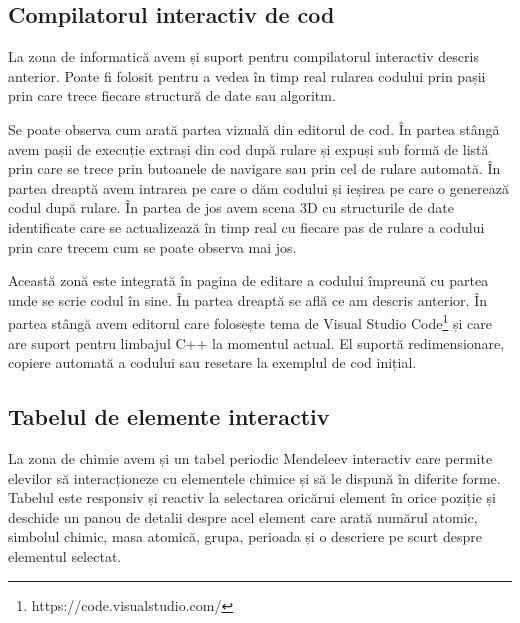 \subsection{Compilatorul interactiv de cod}
\label{subsec:compilator-interactiv}

La zona de informatică avem și suport pentru compilatorul interactiv descris anterior. Poate fi
folosit pentru a vedea în timp real rularea codului prin pașii prin care trece fiecare structură de
date sau algoritm.

Se poate observa cum arată partea vizuală din editorul de cod. În partea stângă avem pașii de 
execuție extrași din cod după rulare și expuși sub formă de listă prin care se trece prin butoanele
de navigare sau prin cel de rulare automată. În partea dreaptă avem intrarea pe care o dăm codului
și ieșirea pe care o generează codul după rulare. În partea de jos avem scena 3D cu structurile de 
date identificate care se actualizează în timp real cu fiecare pas de rulare a codului prin care
trecem cum se poate observa mai jos.


Această zonă este integrată în pagina de editare a codului împreună cu partea unde se scrie codul
în sine. În partea dreaptă se află ce am descris anterior. În partea stângă avem editorul care folosește 
tema de Visual Studio Code\footnote{https://code.visualstudio.com/} și care are suport pentru 
limbajul C++ la momentul actual. El suportă redimensionare, copiere automată a codului sau 
resetare la exemplul de cod inițial.

\subsection{Tabelul de elemente interactiv}
\label{subsec:tablou-elemente-interactiv}

La zona de chimie avem și un tabel periodic Mendeleev interactiv care permite elevilor să interacționeze
cu elementele chimice și să le dispună în diferite forme. Tabelul este responsiv și reactiv
la selectarea oricărui element în orice poziție și deschide un panou de detalii despre acel element
care arată numărul atomic, simbolul chimic, masa atomică, grupa, perioada și o descriere pe scurt 
despre elementul selectat.


